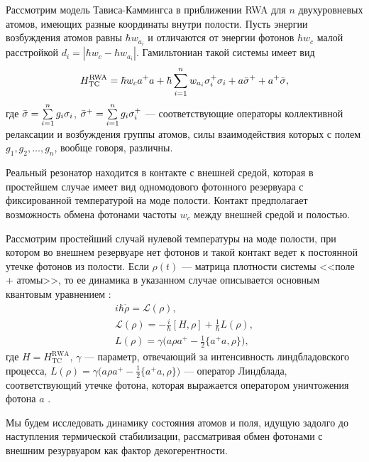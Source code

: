 Рассмотрим модель Тависа-Каммингса в приближении RWA \cite{ozhigov_qq,rwa_rabi_1,rwa_rabi_2} для $n$ двухуровневых атомов, имеющих разные координаты внутри полости. Пусть энергии возбуждения атомов равны $\hbar w_{a_{i}}$ и отличаются от энергии фотонов $\hbar w_{c}$ малой расстройкой $d_i=|\hbar w_{c}-\hbar w_{a_{i}}|$. Гамильтониан такой системы имеет вид
\begin{equation}
	\label{TC}
	H_{\text{TC}}^{\text{RWA}}=\hbar w_{c} a^+a+\hbar \sum\limits_{i=1}^{n}w_{a_{i}}\sigma^{+}_i\sigma_i+a\bar{\sigma}^{+}+a^{+}\bar{\sigma},
\end{equation}
где $\bar{\sigma}=\sum\limits_{i=1}^{n}g_{i}\sigma_{i}$, $\bar{\sigma}^{+}=\sum\limits_{i=1}^ng_{i}\sigma^{+}_{i}$ --- соответствующие операторы коллективной релаксации и возбуждения группы атомов, силы взаимодействия которых с полем $g_{1},g_{2},\dots,g_{n}$, вообще говоря, различны. 

Реальный резонатор находится в контакте с внешней средой, которая в простейшем случае имеет вид одномодового фотонного резервуара с фиксированной температурой на моде полости. Контакт предполагает возможность обмена фотонами частоты $w_{c}$ между внешней средой и полостью. 

Рассмотрим простейший случай нулевой температуры на моде полости, при котором во внешнем резервуаре нет фотонов и такой контакт ведет к постоянной утечке фотонов из полости. Если $\rho(t)$ --- матрица плотности системы <<поле + атомы>>, то ее динамика в указанном случае описывается основным квантовым уравнением \cite{breuer}:
\begin{equation}\label{lindblad}
	\begin{gathered}
		i\hbar\dot{\rho}={\mathcal{L}}(\rho),\\
		{\mathcal{L}}(\rho)=-\frac{i}{\hbar}[H,\rho]+\frac{1}{\hbar}L(\rho),\\
		L(\rho)=\gamma\biggl(a\rho a^+-\frac{1}{2}\{a^+a,\rho\}\biggr),
	\end{gathered}
\end{equation}
где  $H=H_{\text{TC}}^{\text{RWA}}$, $\gamma$ --- параметр, отвечающий за интенсивность линдбладовского процесса, $L(\rho)=\gamma\bigl(a\rho a^{+}-\frac{1}{2}\{a^{+}a,\rho\}\bigr)$ --- оператор Линдблада, соответствующий утечке фотона, которая выражается оператором уничтожения фотона $a$ \cite{breuer,photon_emission}. 

Мы будем исследовать динамику состояния атомов и поля, идущую задолго до наступления термической стабилизации, рассматривая обмен фотонами с внешним резурвуаром как фактор декогерентности.

